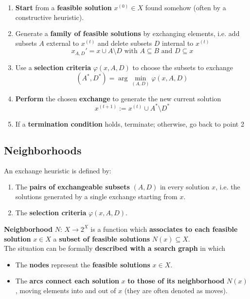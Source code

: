 \documentclass[11pt]{article}
\begin{document}
	\begin{enumerate}
		\item \textbf{Start} from a \textbf{feasible solution} $x^{(0)} \in X$ found somehow (often by a constructive heuristic).\\
		
		\item Generate a \textbf{family of feasible solutions} by exchanging elements, i.e. add subsets $A$ external to $x^{(t)}$ and delete subsets $D$ internal to $x^{(t)}$
		$$ x_{A,D}' = x \cup A \setminus D \text{ with } A \subseteq B \text{ and } D \subseteq x $$
		
		\item Use a \textbf{selection criteria} $\varphi (x, A, D)$ to choose the subsets to exchange
		$$ (A^\ast, D^\ast) = \arg \min_{(A,D)} \varphi (x, A, D) $$
		
		\item \textbf{Perform} the chosen \textbf{exchange} to generate the new current solution
		$$ x^{(t+1)} := x^{(t)} \cup A^\ast \setminus D^\ast $$
		
		\item If a \textbf{termination condition} holds, terminate; otherwise, go back to point 2
	\end{enumerate}
	
	\newpage
	
	\subsection{Neighborhoods} 
	
	An exchange heuristic is defined by:
	\begin{enumerate}
		\item The \textbf{pairs of exchangeable subsets} $(A, D)$ in every solution $x$, i.e. the solutions generated by a single exchange starting from $x$.\\
		
		\item The \textbf{selection criteria} $\varphi (x, A, D)$.\\
	\end{enumerate}
	
	\textbf{Neighborhood} $N : \, X \rightarrow 2^X$ is a function which \textbf{associates to each feasible solution} $x \in X$ a \textbf{subset of feasible solutions} $N (x) \subseteq X$.\\
	
	The situation can be formally \textbf{described with a search graph} in which
	\begin{itemize}
		\item The \textbf{nodes} represent the \textbf{feasible solutions} $x \in X$.\\
		
		\item The \textbf{arcs connect each solution} $x$ \textbf{to those of its neighborhood} $N (x)$, moving elements into and out of $x$ (they are often denoted as moves).\\
	\end{itemize}
	
\end{document}
